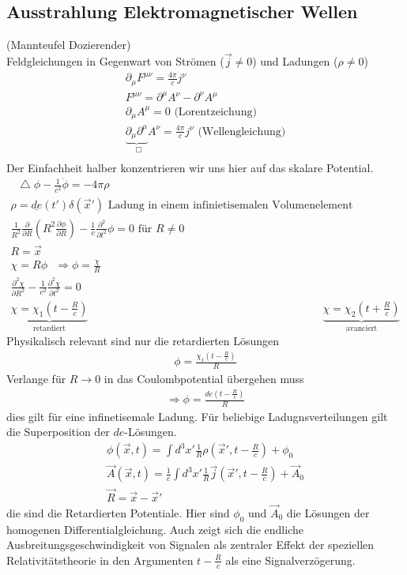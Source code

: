 \documentclass[a4paper]{article}
\newcommand*\laplace{\mathop{}\!\mathbin\bigtriangleup}
\newcommand*\dalembert{\mathop{}\!\mathbin\Box}
\begin{document}
\subsection{Ausstrahlung Elektromagnetischer Wellen}
(Mannteufel Dozierender)\\
Feldgleichungen in Gegenwart von Strömen ($\vec{j}\neq0$) und Ladungen
($\rho\neq0$)\\
\begin{align}
\partial_\mu F^{\mu\nu}=\frac{4\pi}{c}j^\nu\\
F^{\mu\nu}=\partial^\mu A^\nu-\partial^\nu A^\mu\\
\partial_\mu A^\mu=0 \text{ (Lorentzeichung)}\\
\underbrace{\partial_\mu \partial^\mu}_{\dalembert} A^\nu=\frac{4\pi}{c}j^\nu
\text{ (Wellengleichung)}\\
\end{align}
Der Einfachheit halber konzentrieren wir uns hier auf das skalare Potential.
\begin{align}
\laplace\phi-\frac{1}{c^2}\ddot{\phi}=-4\pi\rho\\
\rho=\underline{de}(t')\delta(\vec{x}') \text{ Ladung in einem infinietisemalen
Volumenelement}\\
\frac{1}{R^2}\frac{\partial}{\partial R} \left( R^2 \frac{\partial\phi}{\partial
R}\right)-\frac{1}{c}\frac{\partial^2}{\partial t^2}\phi=0 \text{ für }R\neq0\\
R=\vec{x}\\
\chi=R\phi \text{  }\Rightarrow \phi=\frac{\chi}{R}\\
\frac{\partial^2\chi}{\partial R^2}-\frac{1}{c^2}\frac{\partial^2\chi}{\partial
t^2}=0\\
\underbrace{\chi=\chi_1(t-\frac{R}{c})}_{\text{retardiert}} &
\underbrace{\chi=\chi_2(t+\frac{R}{c})}_{\text{avanciert}}
\end{align}
Physikalisch relevant sind nur die retardierten Lösungen
\begin{align}
\phi=\frac{\chi_1(t-\frac{R}{c})}{R}
\end{align}
Verlange für $R\rightarrow0$ in das Coulombpotential übergehen muss\\
\begin{align}
\Rightarrow \phi=\frac{de\left(t-\frac{R}{c}\right)}{R}
\end{align}
dies gilt für eine infinetisemale Ladung. Für beliebige Ladugnsverteilungen gilt
die Superposition der $de$-Lösungen.
\begin{align}
\phi(\vec{x},t)=\int d^3x'
\frac{1}{R}\rho\left(\vec{x}',t-\frac{R}{c}\right)+\phi_0\\
\vec{A}(\vec{x},t)=\frac{1}{c}\int
d^3x'\frac{1}{R}\vec{j}\left(\vec{x}',t-\frac{R}{c}\right)+\vec{A}_0\\
\vec{R}=\vec{x}-\vec{x}'
\end{align}
die sind die Retardierten Potentiale. Hier sind $\phi_0$ und $\vec{A}_0$ die
Lösungen der homogenen Differentialgleichung. Auch zeigt sich die endliche
Ausbreitungsgeschwindigkeit von Signalen als zentraler Effekt der speziellen
Relativitätstheorie in den Argumenten $t-\frac{R}{c}$ als eine
Signalverzögerung.
\end{document}
